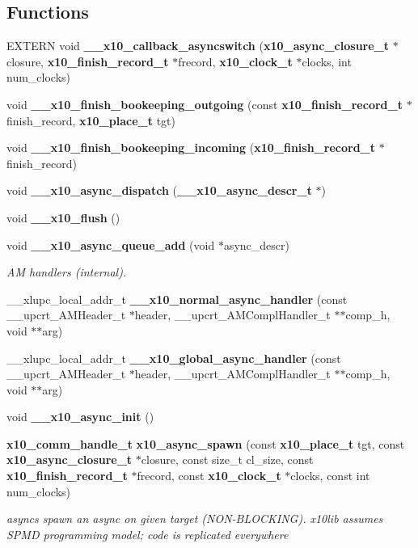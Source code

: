 \subsection*{Functions}
\begin{CompactItemize}
\item 
EXTERN void {\bf \_\-\_\-x10\_\-callback\_\-asyncswitch} ({\bf x10\_\-async\_\-closure\_\-t} $\ast$closure, {\bf x10\_\-finish\_\-record\_\-t} $\ast$frecord, {\bf x10\_\-clock\_\-t} $\ast$clocks, int num\_\-clocks)
\item 
void {\bf \_\-\_\-x10\_\-finish\_\-bookeeping\_\-outgoing} (const {\bf x10\_\-finish\_\-record\_\-t} $\ast$finish\_\-record, {\bf x10\_\-place\_\-t} tgt)
\item 
void {\bf \_\-\_\-x10\_\-finish\_\-bookeeping\_\-incoming} ({\bf x10\_\-finish\_\-record\_\-t} $\ast$finish\_\-record)
\item 
void {\bf \_\-\_\-x10\_\-async\_\-dispatch} ({\bf \_\-\_\-x10\_\-async\_\-descr\_\-t} $\ast$)
\item 
void {\bf \_\-\_\-x10\_\-flush} ()
\item 
void {\bf \_\-\_\-x10\_\-async\_\-queue\_\-add} (void $\ast$async\_\-descr)
\begin{CompactList}\small\item\em AM handlers (internal). \item\end{CompactList}\item 
\_\-\_\-xlupc\_\-local\_\-addr\_\-t {\bf \_\-\_\-x10\_\-normal\_\-async\_\-handler} (const \_\-\_\-upcrt\_\-AMHeader\_\-t $\ast$header, \_\-\_\-upcrt\_\-AMCompl\-Handler\_\-t $\ast$$\ast$comp\_\-h, void $\ast$$\ast$arg)
\item 
\_\-\_\-xlupc\_\-local\_\-addr\_\-t {\bf \_\-\_\-x10\_\-global\_\-async\_\-handler} (const \_\-\_\-upcrt\_\-AMHeader\_\-t $\ast$header, \_\-\_\-upcrt\_\-AMCompl\-Handler\_\-t $\ast$$\ast$comp\_\-h, void $\ast$$\ast$arg)
\item 
void {\bf \_\-\_\-x10\_\-async\_\-init} ()
\item 
{\bf x10\_\-comm\_\-handle\_\-t} {\bf x10\_\-async\_\-spawn} (const {\bf x10\_\-place\_\-t} tgt, const {\bf x10\_\-async\_\-closure\_\-t} $\ast$closure, const size\_\-t cl\_\-size, const {\bf x10\_\-finish\_\-record\_\-t} $\ast$frecord, const {\bf x10\_\-clock\_\-t} $\ast$clocks, const int num\_\-clocks)
\begin{CompactList}\small\item\em asyncs spawn an async on given target (NON-BLOCKING). x10lib assumes SPMD programming model; code is replicated everywhere \item\end{CompactList}\item 

\end{CompactItemize}
